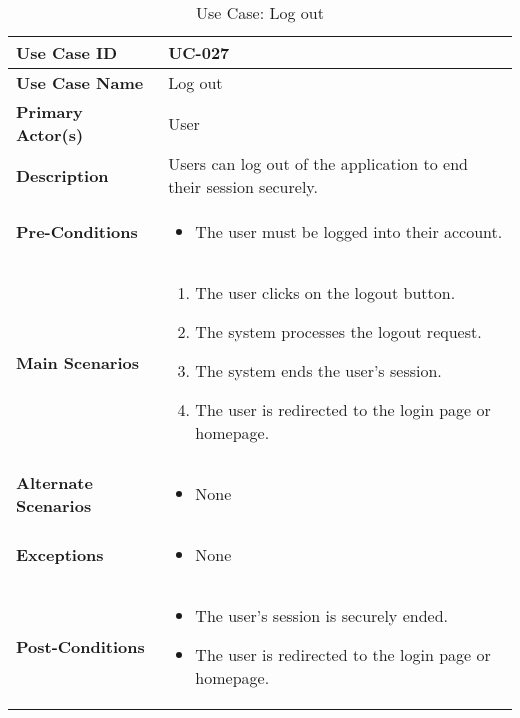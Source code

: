 \begin{table}[!ht]
    \centering
    \renewcommand{\arraystretch}{1.3} %
    \begin{tabularx}{\textwidth}{|l|X|}
        \hline
        \textbf{Use Case ID} & UC-027 \\
        \hline
        \textbf{Use Case Name} & Log out \\
        \hline
        \textbf{Primary Actor(s)} & User \\
        \hline
        \textbf{Description} & Users can log out of the application to end their session securely. \\
        \hline
        \textbf{Pre-Conditions} & 
        \begin{itemize}[label=--,itemsep=0pt]
            \item The user must be logged into their account.
        \end{itemize} \\
        \hline
        \textbf{Main Scenarios} & 
        \begin{enumerate}[label=\arabic*.,itemsep=0pt]
            \item The user clicks on the logout button.
            \item The system processes the logout request.
            \item The system ends the user's session.
            \item The user is redirected to the login page or homepage.
        \end{enumerate} \\
        \hline
        \textbf{Alternate Scenarios} & 
        \begin{itemize}[label=--,itemsep=0pt]
            \item None
        \end{itemize} \\
        \hline
        \textbf{Exceptions} & 
        \begin{itemize}[label=--,itemsep=0pt]
            \item None
        \end{itemize} \\
        \hline
        \textbf{Post-Conditions} & 
        \begin{itemize}[label=--,itemsep=0pt]
            \item The user's session is securely ended.
            \item The user is redirected to the login page or homepage.
        \end{itemize} \\
        \hline
    \end{tabularx}
    \caption{Use Case: Log out}
    \label{tab:use-case-log-out}
\end{table}


